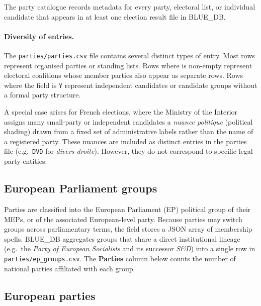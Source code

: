 
The party catalogue records metadata for every party, electoral list, or
individual candidate that appears in at least one election result file in
BLUE\_DB.

\paragraph{Diversity of entries.}
The \texttt{parties/parties.csv} file contains several distinct types of
entry.  Most rows represent organised parties or standing lists.  Rows where
 is non-empty represent electoral coalitions whose
member parties also appear as separate rows.  Rows where the field
 is \texttt{Y} represent independent
candidates or candidate groups without a formal party structure.

A special case arises for French elections, where the Ministry of the Interior
assigns many small-party or independent candidates a \emph{nuance politique} (political shading) drawn from a
fixed set of administrative labels rather than the name of a registered party.
These nuances are included as distinct entries in the parties file (e.g.\
\texttt{DVD} for \emph{divers droite}). However, they do not correspond to
specific legal party entities.

\subsection{European Parliament groups}

Parties are classified into the European Parliament (EP) political group of
their MEPs, or of the associated European-level party.  Because parties may
switch groups across parliamentary terms, the \bluevar{ep\_group} field stores
a JSON array of membership spells.  BLUE\_DB aggregates groups that share a
direct institutional lineage (e.g.\ the \emph{Party of European Socialists}
and its successor \emph{S\&D}) into a single row in
\texttt{parties/ep\_groups.csv}.  The \textbf{Parties} column below
counts the number of national parties affiliated with each group.


\subsection{European parties}

